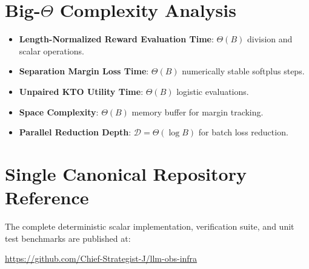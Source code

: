 \documentclass[11pt,a4paper]{article}
\theoremstyle{definition}
\begin{document}
\section{Big-$\Theta$ Complexity Analysis}

\begin{itemize}
    \item \textbf{Length-Normalized Reward Evaluation Time}: $\Theta(B)$ division and scalar operations.
    \item \textbf{Separation Margin Loss Time}: $\Theta(B)$ numerically stable softplus steps.
    \item \textbf{Unpaired KTO Utility Time}: $\Theta(B)$ logistic evaluations.
    \item \textbf{Space Complexity}: $\Theta(B)$ memory buffer for margin tracking.
    \item \textbf{Parallel Reduction Depth}: $\mathcal{D} = \Theta(\log B)$ for batch loss reduction.
\end{itemize}

\section{Single Canonical Repository Reference}

The complete deterministic scalar implementation, verification suite, and unit test benchmarks are published at:
\begin{center}
\url{https://github.com/Chief-Strategist-J/llm-obs-infra}
\end{center}
\end{document}
